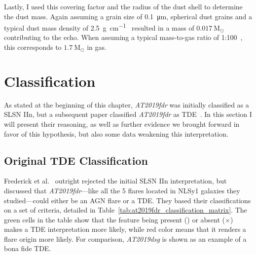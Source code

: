 Lastly, I used this covering factor and the radius of the dust shell to determine the dust mass. Again assuming a grain size of \SI{0.1}{\micro\m}, spherical dust grains and a typical dust mass density of \SI{2.5}{\g\per\cm}~ resulted in a mass of $0.017 ~\text{M}_\odot$ contributing to the echo. When assuming a typical mass-to-gas ratio of 1:100~, this corresponds to $1.7 ~\text{M}_\odot$ in gas.

\section{Classification}
As stated at the beginning of this chapter, \emph{AT2019fdr} was initially classified as a SLSN IIn, but a subsequent paper classified \emph{AT2019fdr} as TDE~\cite{Frederick2021}. In this section I will present their reasoning, as well as further evidence we brought forward in favor of this hypothesis, but also some data weakening this interpretation.

\subsection{Original TDE Classification}
Frederick et al.~\cite{Frederick2021} outright rejected the initial SLSN IIn interpretation, but discussed that \emph{AT2019fdr}---like all the 5 flares located in NLSy1 galaxies they studied---could either be an AGN flare or a TDE. They based their classifications on a set of criteria, detailed in Table~\ref{tab:at2019fdr_classification_matrix}. The green cells in the table show that the feature being present (\checkmark) or absent ($\times$) makes a TDE interpretation more likely, while red color means that it renders a flare origin more likely. For comparison, \textit{AT2019dsg} is shown as an example of a bona fide TDE.

